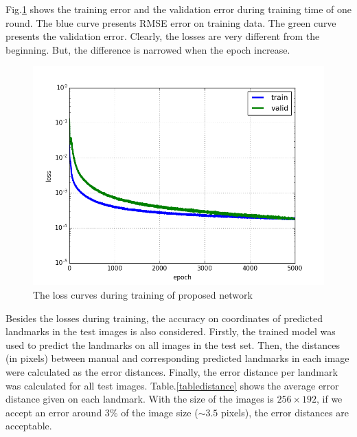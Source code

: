 \documentclass[10pt]{article}
\begin{document}
Fig.\ref{cnnlosses} shows the training error and the validation error during training time of one round. The blue curve presents RMSE error on training data. The green curve presents the validation error. Clearly, the losses are very different from the beginning. But, the difference is narrowed when the epoch increase.

\begin{figure}[htbp]
\centering
\includegraphics[scale=0.417]{images/losses}
\caption{The loss curves during training of proposed network} 
\label{cnnlosses}
\end{figure}

Besides the losses during training, the accuracy on coordinates of predicted landmarks in the test images is also considered. Firstly, the trained model was used to predict the landmarks on all images in the test set. Then, the distances (in pixels) between manual and corresponding predicted landmarks in each image were calculated as the error distances. Finally, the error distance per landmark was calculated for all test images. Table.\ref{tabledistance} shows the average error distance given on each landmark. With the size of the images is $256 \times 192$, if we accept an error around $3\%$ of the image size ($ \sim3.5$ pixels), the error distances are acceptable.
\end{document}
